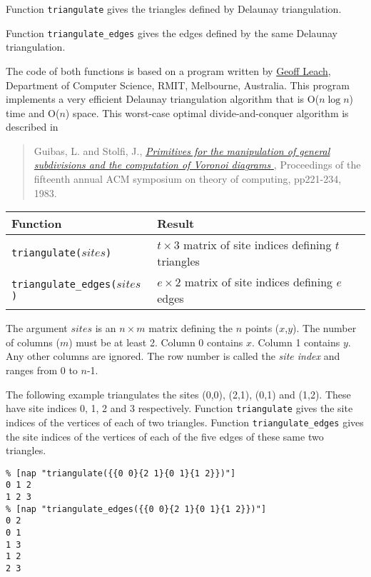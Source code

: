 Function \texttt{triangulate} gives the triangles defined by Delaunay triangulation.

Function \texttt{triangulate\_edges} gives the edges defined by the same Delaunay triangulation.

The code of both functions is based on a
  program written by 
  \href{http://goanna.cs.rmit.edu.au/$\sim$gl/}{Geoff Leach},
  Department of Computer Science, RMIT, Melbourne, Australia. This
  program implements a very efficient Delaunay triangulation algorithm
  that is O($n \log n$) time and O($n$) space. This worst-case optimal divide-and-conquer
  algorithm is described in
\begin{quote}
  Guibas, L. and Stolfi, J., 
  \href{http://portal.acm.org/citation.cfm?id=808751&dl=ACM&coll=portal}
  {\emph
  {Primitives for the manipulation of general subdivisions and the computation of Voronoi diagrams}
  }, Proceedings of the fifteenth annual ACM symposium on theory of computing, pp221-234, 1983.
\end{quote}

  \begin{tabular}{|l|l|}
    \hline 
      \textbf{Function} & \textbf{Result}
    \\
      \hline 
      \hline 
\texttt{triangulate(}$sites$\texttt{)} & $t\times 3$ matrix of site indices defining $t$ triangles
      \\
      \hline 
\texttt{triangulate\_edges(}$sites$\texttt{)} & $e\times 2$ matrix of site indices defining $e$ edges
      \\
  \hline
\end{tabular}

The argument $sites$ is an $n\times m$ matrix defining the 
  $n$ points ($x$,$y$). The number of columns ($m$) must be at least 2. Column 0 contains 
  $x$. Column 1 contains 
  $y$. Any other columns are ignored. The row number is called
  the 
  \textit{site index} and ranges from 0 to 
  $n$-1.
  \par The following example triangulates the sites (0,0), (2,1), (0,1)
  and (1,2). These have site indices 0, 1, 2 and 3 respectively.
  Function 
  \texttt{triangulate} gives the site indices of the vertices of
  each of two triangles. Function 
  \texttt{triangulate\_edges} gives the site indices of the vertices
  of each of the five edges of these same two triangles.
  \begin{verbatim}
% [nap "triangulate({{0 0}{2 1}{0 1}{1 2}})"]
0 1 2
1 2 3
% [nap "triangulate_edges({{0 0}{2 1}{0 1}{1 2}})"]
0 2
0 1
1 3
1 2
2 3
\end{verbatim}

